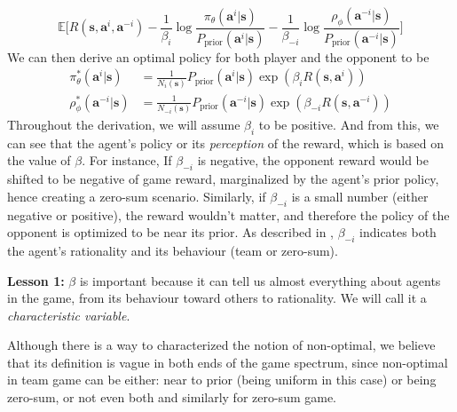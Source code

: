 \begin{equation}
    \mathbb{E}\Bigg[ R(\boldsymbol{s}, \boldsymbol{a}^i, \boldsymbol{a}^{-i}) - \frac{1}{\beta_i} \log \frac{\pi_{\theta}(\boldsymbol{a}^i | \boldsymbol{s})}{P_{\text{prior}}(\boldsymbol{a}^i | \boldsymbol{s})} - \frac{1}{\beta_{-i}} \log \frac{\rho_{\phi}(\boldsymbol{a}^{-i} | \boldsymbol{s})}{P_{\text{prior}}(\boldsymbol{a}^{-i} | \boldsymbol{s})}  \Bigg]
\end{equation}
We can then derive an optimal policy for both player and the opponent to be 
\begin{equation}
    \begin{aligned}
        \pi_{\theta}^*(\boldsymbol{a}^i | \boldsymbol{s}) &= \frac{1}{N_{i}(\boldsymbol{s})} P_{\text{prior}}(\boldsymbol{a}^i | \boldsymbol{s}) \exp\left( \beta_i R(\boldsymbol{s}, \boldsymbol{a}^i) \right) \\
        \rho_{\phi}^*(\boldsymbol{a}^{-i} | \boldsymbol{s}) &= \frac{1}{N_{-i}(\boldsymbol{s})} P_{\text{prior}}(\boldsymbol{a}^{-i} | \boldsymbol{s}) \exp\left( \beta_{-i} R(\boldsymbol{s}, \boldsymbol{a}^{-i}) \right)
    \end{aligned}
\end{equation}
Throughout the derivation, we will assume $\beta_i$ to be positive. 
And from this, we can see that the agent's policy or its \emph{perception} of the reward, which is based on the value of $\beta$. For instance, If $\beta_{-i}$ is negative, the opponent reward would be shifted to be negative of game reward, marginalized by the agent's prior policy, hence creating a zero-sum scenario. Similarly, if $\beta_{-i}$ is a small number (either negative or positive), the reward wouldn't matter, and therefore the policy of the opponent is optimized to be near its prior. As described in \cite{grau2018balancing}, $\beta_{-i}$ indicates both the agent's rationality and its behaviour (team or zero-sum).

\begin{tcolorbox}
\textbf{Lesson 1: } $\beta$ is important because it can tell us almost everything about agents in the game, from its behaviour toward others to rationality. We will call it a \emph{characteristic variable}. 
\end{tcolorbox}
Although there is a way to characterized the notion of non-optimal, we believe that its definition is vague in both ends of the game spectrum, since non-optimal in team game can be either: near to prior (being uniform in this case) or being zero-sum, or not even both and similarly for zero-sum game. 

